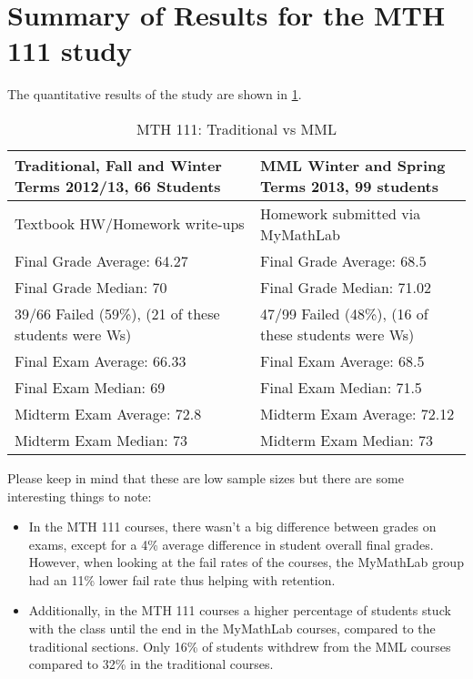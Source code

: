 \section{Summary of Results for the MTH 111 study}
The quantitative results of the study are shown in \cref{app:tab:onlinehwstudy111}.
\begin{longtable}{p{}p{}}
	\caption{MTH 111: Traditional vs MML}\label{app:tab:onlinehwstudy111}\\
	\toprule
	Traditional, Fall and Winter Terms 2012/13, 66 Students & MML Winter and Spring Terms 2013, 99 students       \\
	\midrule
	Textbook HW/Homework write-ups                          & Homework submitted via MyMathLab                    \\
	Final Grade Average:  64.27                             & Final Grade Average:  68.5                          \\
	Final Grade Median:  70                                 & Final Grade Median:  71.02                          \\
	39/66 Failed (59\%), (21 of these students were Ws)     & 47/99 Failed (48\%), (16 of these students were Ws) \\
	Final Exam Average:  66.33                              & Final Exam Average:  68.5                           \\
	Final Exam Median:  69                                  & Final Exam Median:  71.5                            \\
	Midterm Exam Average:  72.8                             & Midterm Exam Average:  72.12                        \\
	Midterm Exam Median:  73                                & Midterm Exam Median:  73                            \\
	\bottomrule
\end{longtable}
Please keep in mind that these are low sample sizes but there are some
interesting things to note: 
\begin{itemize}
	\item In the MTH 111 courses, there wasn't a big difference between grades on
	exams, except for a 4\% average difference in student overall final grades.
	However, when looking at the fail rates of the courses, the MyMathLab group
	had an 11\% lower fail rate thus helping with retention.
	\item Additionally, in the MTH 111 courses a higher percentage of students
	stuck with the class until the end in the MyMathLab courses, compared to
	the traditional sections.  Only 16\% of students withdrew from the MML
	courses compared to 32\% in the traditional courses.  
\end{itemize}

